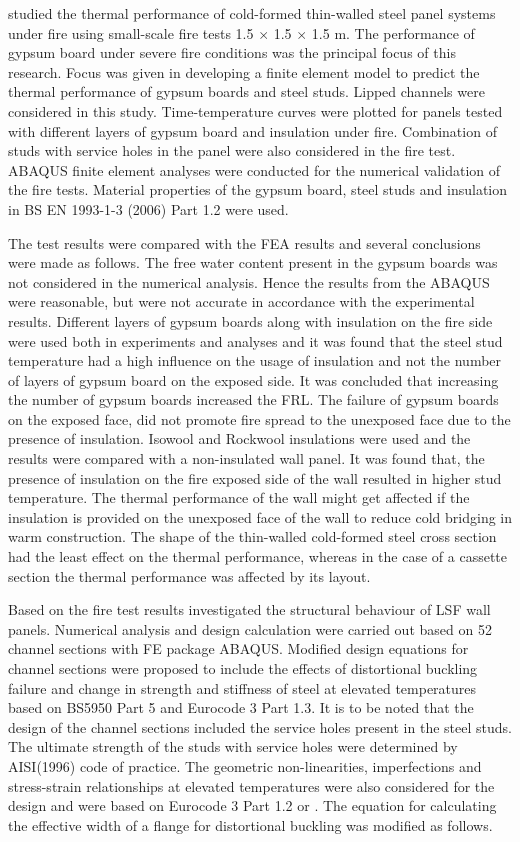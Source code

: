 \citet{Feng2003c} studied the thermal performance of cold-formed thin-walled steel panel systems under fire using small-scale fire tests 1.5 $\times$ 1.5 $\times$ 1.5 m. The performance of gypsum board under severe fire conditions was the principal focus of this research. Focus was given in developing a finite element model to predict the thermal performance of gypsum boards and steel studs. Lipped channels were considered in this study. Time-temperature curves were plotted for panels tested with different layers of gypsum board and insulation under fire. Combination of studs with service holes in the panel were also considered in the fire test. ABAQUS finite element analyses were conducted for the numerical validation of the fire tests. Material properties of the gypsum board, steel studs and insulation in BS EN 1993-1-3 (2006) Part 1.2 were used.

The test results were compared with the FEA results and several conclusions were made as follows. The free water content present in the gypsum boards was not considered in the numerical analysis. Hence the results from the ABAQUS  were reasonable, but were not accurate in accordance with the experimental results. Different layers of gypsum boards along with insulation on the fire side were used both in experiments and analyses and it was found that the steel stud temperature had a high influence on the usage of insulation and not the number of layers of gypsum board on the exposed side. It was concluded that increasing the number of gypsum boards increased the FRL. The failure of gypsum boards on the exposed face, did not promote fire spread to the unexposed face due to the presence of insulation. Isowool and Rockwool insulations were used and the results were compared with a non-insulated wall panel. It was found that, the presence of insulation on the fire exposed side of the wall resulted in higher stud temperature. The thermal performance of the wall might get affected if the insulation is provided on the unexposed face of the wall to reduce cold bridging in warm construction. The shape of the thin-walled cold-formed steel cross section had the least effect on the thermal performance, whereas in the case of a cassette section the thermal performance was affected by its layout.  

Based on the fire test results \citet{Feng2003d} investigated the structural behaviour of LSF wall panels. Numerical analysis and design calculation were carried out based on 52 channel sections with FE package ABAQUS. Modified design equations for channel sections were proposed to include the effects of distortional buckling failure and change in strength and stiffness of steel at elevated temperatures based on BS5950 Part 5 and Eurocode 3 Part 1.3. It is to be noted that the design of the channel sections included the service holes present in the steel studs. The ultimate strength of the studs with service holes were determined by AISI(1996) code of practice. The geometric non-linearities, imperfections and stress-strain relationships at elevated temperatures were also considered for the design and were based on Eurocode 3 Part 1.2 or \citet{Outinen1997}. The equation for calculating the effective width of a flange for distortional buckling was modified as follows.

